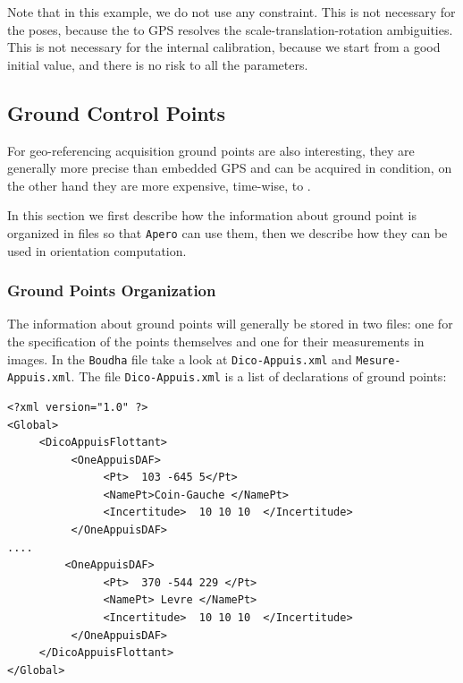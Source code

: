 Note that in this example, we do not use any constraint. This is not necessary for the poses,
because the 
 to GPS resolves the scale-translation-rotation ambiguities.
This is not necessary for the internal calibration, because we start from a good initial
value, and there is no risk to  %
 all the parameters.



\subsection{Ground Control Points}

For geo-referencing acquisition ground points are also interesting,
they are generally more precise than embedded GPS and can be acquired in 
 condition, on the other hand they are more expensive, time-wise, to
.

In this section we first describe how the information about ground point
is organized in files so that {\tt Apero} can use them, then we describe
how they can be used in orientation computation.


\subsubsection{Ground Points Organization}

\label{GCP:Org}

The information about ground points will generally be stored in two files:
one for the specification of the points themselves and one for their measurements
in images. In the {\tt Boudha} file take a look at {\tt Dico-Appuis.xml}
and {\tt Mesure-Appuis.xml}. The file {\tt Dico-Appuis.xml} is a list
of declarations of ground points:

{\scriptsize
\begin{verbatim}
<?xml version="1.0" ?>
<Global>
     <DicoAppuisFlottant>
          <OneAppuisDAF>
               <Pt>  103 -645 5</Pt>
               <NamePt>Coin-Gauche </NamePt>
               <Incertitude>  10 10 10  </Incertitude>
          </OneAppuisDAF>
....     
         <OneAppuisDAF>
               <Pt>  370 -544 229 </Pt>
               <NamePt> Levre </NamePt>
               <Incertitude>  10 10 10  </Incertitude>
          </OneAppuisDAF>
     </DicoAppuisFlottant>
</Global>
\end{verbatim}
}

